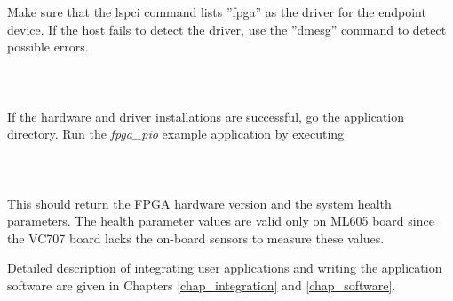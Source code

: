 Make sure that the lspci command lists ''fpga'' as the driver for the endpoint device.
If the host fails to detect the driver, use the ''dmesg'' command to detect possible errors.\\\\
\\\\
If the hardware and driver installations are successful, go the application directory.
Run the \emph{fpga\_pio} example application by executing\\\\
\\\\
This should return the FPGA hardware version and the system health parameters.
The health parameter values are valid only on ML605 board since the VC707 board lacks the on-board sensors to measure these values.

Detailed description of integrating user applications and writing the application software are given in Chapters \ref{chap_integration} and \ref{chap_software}.